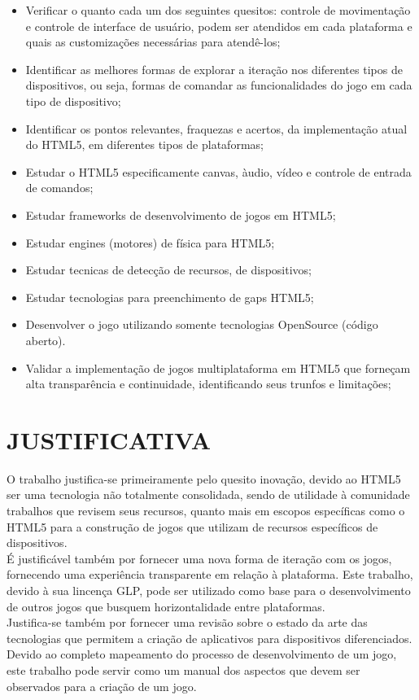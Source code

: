 \documentclass{article}
\begin{document}
\begin{itemize}
    \item Verificar o quanto cada um dos seguintes quesitos: controle de movimentação e controle de interface de usuário, podem ser atendidos em cada plataforma e quais as customizações necessárias para atendê-los;
    \item Identificar as melhores formas de explorar a iteração nos diferentes tipos de dispositivos, ou seja, formas de comandar as funcionalidades do jogo em cada tipo de dispositivo;

    \item Identificar os pontos relevantes, fraquezas e acertos, da implementação atual do HTML5, em diferentes tipos de plataformas;

    \item Estudar o HTML5 especificamente canvas, àudio, vídeo e controle de entrada de comandos;

    \item Estudar frameworks de desenvolvimento de jogos em HTML5;

    \item Estudar engines (motores) de física para HTML5;

    \item Estudar tecnicas de detecção de recursos, de dispositivos;

    \item Estudar tecnologias para preenchimento de gaps HTML5;

    \item Desenvolver o jogo utilizando somente tecnologias OpenSource (código aberto).

    \item Validar a implementação de jogos multiplataforma em HTML5 que forneçam alta transparência e continuidade, identificando seus trunfos e limitações;

\end{itemize}

\section{JUSTIFICATIVA}

O trabalho justifica-se primeiramente pelo quesito inovação, devido ao HTML5 ser uma tecnologia não totalmente consolidada, sendo de utilidade à comunidade trabalhos que revisem seus recursos, quanto mais em escopos específicas como o HTML5 para a construção de jogos que utilizam de recursos específicos de dispositivos.
\\
	É justificável também por fornecer uma nova forma de iteração com os jogos, fornecendo uma experiência transparente em relação à plataforma. Este trabalho, devido à sua lincença GLP, pode ser utilizado como base para o desenvolvimento de outros jogos que busquem horizontalidade entre plataformas.
\\
	Justifica-se também por fornecer uma revisão sobre o estado da arte das tecnologias que permitem a criação de aplicativos para dispositivos diferenciados. Devido ao completo mapeamento do processo de desenvolvimento de um jogo, este trabalho pode servir como um manual dos aspectos que devem ser observados para a criação de um jogo.
\end{document}
